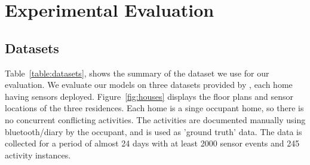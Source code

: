 \section{Experimental Evaluation}\label{sec:eval}

\subsection{Datasets}


Table~\ref{table:datasets}, shows the summary of the dataset we use for our evaluation. We evaluate our models on three datasets provided by \cite{tvkasteren2010}, each home having sensors deployed. Figure~\ref{fig:houses} displays the floor plans and sensor locations of the three residences. Each home is a singe occupant home, so there is no concurrent conflicting activities. The activities are documented manually using bluetooth/diary by the occupant, and is used as 'ground truth' data. The data is collected for a period of almost 24 days with at least 2000 sensor events and 245 activity instances.

